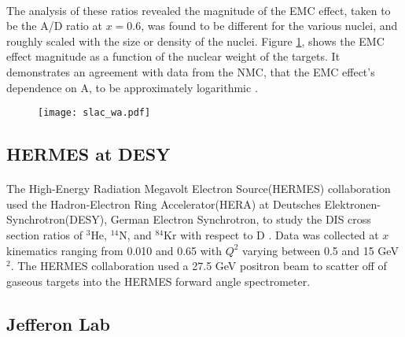 \paragraph{} The analysis of these ratios revealed the magnitude of the EMC effect, taken to be the A/D ratio at $x=0.6$, was found to be different for the various nuclei, and roughly scaled with the size or density of the nuclei. Figure \ref{gomez_wa}, shows the EMC effect magnitude as a function of the nuclear weight of the targets. It demonstrates an agreement with data from the NMC, that the EMC effect's dependence on A, to be approximately logarithmic \cite{Ajth,gomez,seelyth}. 
\begin{figure}[h]
	\centering
	\caption{ \cite{gomez}}
	\label{gomez_wa}
	\texttt{[image: slac\_wa.pdf]} 
\end{figure} 
\subsection{HERMES at DESY}
\paragraph{}
The High-Energy Radiation Megavolt Electron Source(HERMES) collaboration used the Hadron-Electron Ring Accelerator(HERA) at Deutsches Elektronen-Synchrotron(DESY), German Electron Synchrotron, to study the DIS cross section ratios of $^3$He, $^{14}$N, and $^{84}$Kr with respect to D \cite{HERMES_EMC}. Data was collected at $x$ kinematics ranging from 0.010 and 0.65 with $Q^2$ varying between 0.5 and 15 GeV$^2$\cite{HERMES_EMC}. The HERMES collaboration used a 27.5 GeV positron beam to scatter off of gaseous targets into the HERMES forward angle spectrometer. 
\subsection{Jefferon Lab}

\iffalse
\begin{figure}[h]
	\centering
	\caption{EMC effect from EMC, SLAC, and BCDMS \cite{Norton}}
	\label{EMC3}
	\centering
	\texttt{[image: EMC3.png]}
\end{figure}

\begin{figure}[h]
	\centering
	\caption{ Graph of the ratio of A/D structure functions vs $x$ for Carbon \cite{CC}.}
	\label{EMC 1}
	\texttt{[image: EMC1.png]} 
\end{figure} 
\fi



